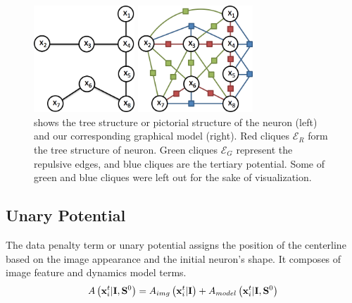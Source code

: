 \documentclass{article}
\begin{document}
\begin{figure}[tb!]
	\centering
	\begin{minipage}[b]{0.49\linewidth}
		\centerline{\includegraphics[height=4cm]{img/neurontree.png}}
	\end{minipage}
	\begin{minipage}[b]{0.49\linewidth}
		\centerline{\includegraphics[height=4cm]{img/neuronmrf.png}}
	\end{minipage}
	\vspace{-10pt}
	\caption{\small{shows the tree structure or pictorial structure of the neuron (left) and our corresponding graphical model (right). Red cliques $\mathcal{E}_R$ form the tree structure of neuron. Green cliques $\mathcal{E}_G$ represent the repulsive edges, and blue cliques are the tertiary potential. Some of green and blue cliques were left out for the sake of visualization.}}
	\label{fig:sample_frame}
	\vspace{-10pt}
\end{figure}


\subsection{Unary Potential} \label{sec:unary_pot}
The data penalty term or unary potential assigns the position of the centerline based on the image appearance and the initial neuron's shape. It composes of image feature and dynamics model terms.
\begin{equation}
A\left( {\bf x}_i^t | {\bf I}, {\bf S}^0 \right) = A_{img}\left({\bf x}_i^t | {\bf I}\right) + A_{model}\left({\bf x}_i^t | {\bf I}, {\bf S}^0\right)
\end{equation}
\end{document}
